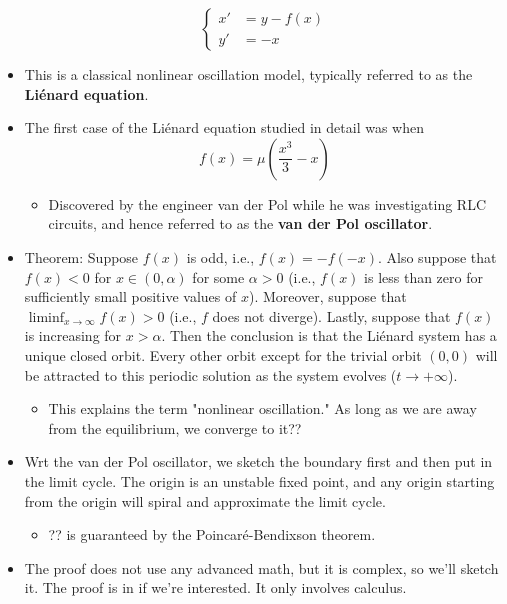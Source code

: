 \documentclass[../notes.tex]{subfiles}
\begin{document}
\begin{itemize}
\begin{equation*}
        \begin{cases}
            x' &= y-f(x)\\
            y' &= -x
        \end{cases}
    \end{equation*}
    \item This is a classical nonlinear oscillation model, typically referred to as the \textbf{Li\'{e}nard equation}.
    \item The first case of the Li\'{e}nard equation studied in detail was when
    \begin{equation*}
        f(x) = \mu\left( \frac{x^3}{3}-x \right)
    \end{equation*}
    \begin{itemize}
        \item Discovered by the engineer van der Pol while he was investigating RLC circuits, and hence referred to as the \textbf{van der Pol oscillator}.
    \end{itemize}
    \item Theorem: Suppose $f(x)$ is odd, i.e., $f(x)=-f(-x)$. Also suppose that $f(x)<0$ for $x\in(0,\alpha)$ for some $\alpha>0$ (i.e., $f(x)$ is less than zero for sufficiently small positive values of $x$). Moreover, suppose that $\liminf_{x\to\infty}f(x)>0$ (i.e., $f$ does not diverge). Lastly, suppose that $f(x)$ is increasing for $x>\alpha$. Then the conclusion is that the Li\'{e}nard system has a unique closed orbit. Every other orbit except for the trivial orbit $(0,0)$ will be attracted to this periodic solution as the system evolves ($t\to +\infty$).
    \begin{itemize}
        \item This explains the term "nonlinear oscillation." As long as we are away from the equilibrium, we converge to it??
    \end{itemize}
    \item Wrt the van der Pol oscillator, we sketch the boundary first and then put in the limit cycle. The origin is an unstable fixed point, and any origin starting from the origin will spiral and approximate the limit cycle.
    \begin{itemize}
        \item ?? is guaranteed by the Poincar\'{e}-Bendixson theorem.
    \end{itemize}
    \item The proof does not use any advanced math, but it is complex, so we'll sketch it. The proof is in \textcite{bib:Teschl} if we're interested. It only involves calculus.

\end{itemize}
\end{document}
